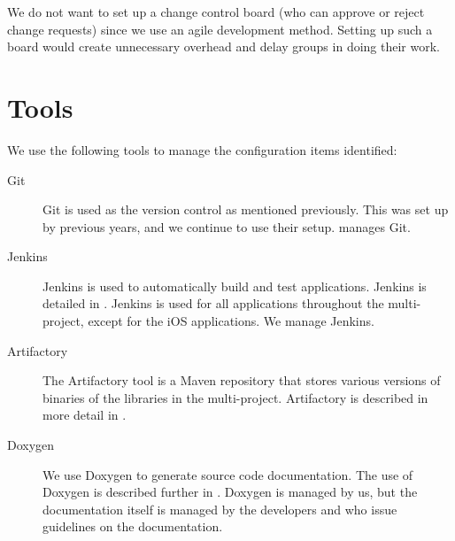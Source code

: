 We do not want to set up a change control board \parencite[p. 6-9]{swebok} (who can approve or reject change requests) since we use an agile development method. Setting up such a board would create unnecessary overhead and delay groups in doing their work.

\section{Tools}\label{sec:SCM_tools}
We use the following tools to manage the configuration items identified:

\begin{description}
  \item[Git] Git is used as the version control as mentioned previously. This was set up by previous years, and we continue to use their setup.  manages Git.
  \item[Jenkins] Jenkins is used to automatically build and test applications. Jenkins is detailed in . Jenkins is used for all applications throughout the multi-project, except for the iOS applications. We manage Jenkins.
  \item[Artifactory] The Artifactory tool is a Maven repository that stores various versions of binaries of the libraries in the multi-project. Artifactory is described in more detail in .
  \item[Doxygen] We use Doxygen to generate source code documentation. The use of Doxygen is described further in . Doxygen is managed by us, but the documentation itself is managed by the developers and  who issue guidelines on the documentation.
\end{description}
